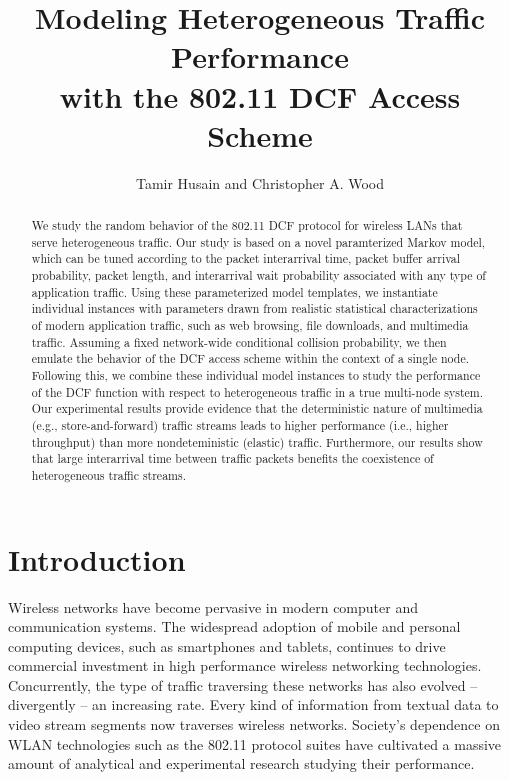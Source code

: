 \documentclass{llncs}
\begin{document}
\mainmatter
\title{Modeling Heterogeneous Traffic Performance \\ with the 802.11 DCF Access Scheme}
\author{Tamir Husain and Christopher A. Wood}
\maketitle

\begin{abstract}
We study the random behavior of the 802.11 DCF protocol for wireless LANs that serve heterogeneous traffic. Our study is based on a novel paramterized Markov model, which can be tuned according to the packet interarrival time, packet buffer arrival probability, packet length, and interarrival wait probability associated with any type of application traffic. Using these parameterized model templates, we instantiate individual instances with parameters drawn from realistic statistical characterizations of modern application traffic, such as web browsing, file downloads, and multimedia traffic. Assuming a fixed network-wide conditional collision probability, we then emulate the behavior of the DCF access scheme within the context of a single node. Following this, we combine these individual model instances to study the performance of the DCF function with respect to heterogeneous traffic in a true multi-node system. Our experimental results provide evidence that the deterministic nature of multimedia (e.g., store-and-forward) traffic streams leads to higher performance (i.e., higher throughput) than more nondeteministic (elastic) traffic. Furthermore, our results show that large interarrival time between traffic packets benefits the coexistence of heterogeneous traffic streams. 
\end{abstract}

\section{Introduction}
Wireless networks have become pervasive in modern computer and communication systems. The widespread adoption of mobile and personal computing devices, such as smartphones and tablets, continues to drive commercial investment in high performance wireless networking technologies. Concurrently, the type of traffic traversing these networks has also evolved -- divergently -- an increasing rate. Every kind of information from textual data to video stream segments now traverses wireless networks. Society's dependence on WLAN technologies such as the 802.11 protocol suites have cultivated a massive amount of analytical and experimental research studying their performance. 
\end{document}
